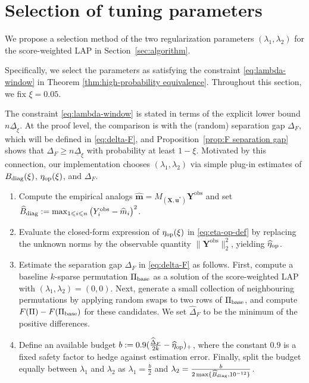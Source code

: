 \documentclass[11pt, reqno]{amsart}
\renewcommand{\le}{\leqslant}
\renewcommand{\ge}{\geqslant}
\newcommand{\1}{\mbox{1}\hspace{-0.25em}\mbox{l}}
\newcommand{\obs}{\mathrm{obs}}
\theoremstyle{definition}\newtheorem{problem}{Problem}[section]
\theoremstyle{definition}\newtheorem{definition}[problem]{Definition}
\theoremstyle{remark}\newtheorem{assumption}{Assumption}
\theoremstyle{remark}\newtheorem{remark}[problem]{Remark}
\theoremstyle{definition}\newtheorem{example}[problem]{Example}
\theoremstyle{plain}\newtheorem{theorem}[problem]{Theorem}
\theoremstyle{plain}\newtheorem{question}[problem]{Question}
\theoremstyle{plain}\newtheorem{lemma}[problem]{Lemma}
\theoremstyle{plain}\newtheorem{proposition}[problem]{Proposition}
\theoremstyle{plain}\newtheorem{corollary}[problem]{Corollary}
\theoremstyle{plain}\newtheorem{conjecture}[problem]{Conjecture}
\begin{document}
\section{Selection of tuning parameters}\label{sec:tuning}

We propose a selection method of the two regularization parameters $(\lambda_1,\lambda_2)$ for the score-weighted LAP in Section~\ref{sec:algorithm}. 

Specifically, we select the parameters as satisfying the constraint \eqref{eq:lambda-window} in Theorem \ref{thm:high-probability equivalence}. 
Throughout this section, we fix $\xi=0.05$.

The constraint \eqref{eq:lambda-window} is stated in terms of the explicit lower bound
$n\underline\Delta_\xi$.
At the proof level, the comparison is with the (random) separation gap
$\Delta_F$, which will be defined in \eqref{eq:delta-F}, and Proposition~\ref{prop:F separation gap} shows that
$\Delta_F\ge n\underline\Delta_\xi$ with probability at least $1-\xi$.
Motivated by this connection, our implementation chooses $(\lambda_1,\lambda_2)$ via simple
plug-in estimates of $B_{\rm diag}(\xi)$, $\eta_{\rm op}(\xi)$, and $\Delta_F$.

\begin{enumerate}
\item Compute the empirical analogs $\widehat{\bm m} = M_{(\bm X,\bm u^*)}\bm Y^{\obs}$ and set $
      \widehat B_{\rm diag}:=\max_{1\le i\le n}\left(Y_i^{\obs}-\widehat m_i\right)^2$.
\item Evaluate the closed-form expression of $\eta_{\rm op}(\xi)$ in \eqref{eq:eta-op-def} by
      replacing the unknown norms by the observable quantity $\|\bm Y^{\obs}\|_2^2$,
      yielding $\widehat\eta_{\rm op}$.
\item Estimate the separation gap $\Delta_F$ in \eqref{eq:delta-F} as follows.
      First, compute a baseline $k$-sparse permutation $\Pi_{\rm base}$ as a solution of the score-weighted LAP with $(\lambda_1,\lambda_2)=(0,0)$. Next, generate a small collection of
      neighbouring permutations by applying random swaps to two rows of $\Pi_{\rm base}$, and compute
      $F(\Pi)-F(\Pi_{\rm base})$ for these candidates. We set $\widehat\Delta_F$ to be the minimum of
      the positive differences.
    
\item Define an available budget $
      b:=0.9(\frac{\widehat\Delta_F}{2k}-\widehat\eta_{\rm op})_+$,
      where the constant $0.9$ is a fixed safety factor to hedge against estimation error.
      Finally, split the budget equally between $\lambda_1$ and $\lambda_2$ as $
      \lambda_1=\frac{b}{2}$ and $\lambda_2=\frac{b}{2\max\{\widehat B_{\rm diag},10^{-12}\}}$.
\end{enumerate}
\end{document}
